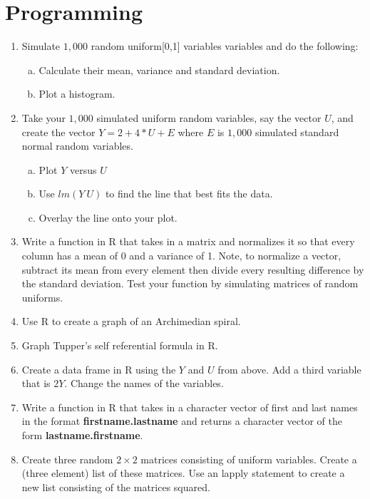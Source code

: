 \documentclass[12pt]{article}
\begin{document}
\section{Programming}
\begin{enumerate}[1.]
\item Simulate $1,000$ random uniform[0,1] variables
  variables and do the following:
  \begin{enumerate}[a.]
  \item Calculate their mean, variance and standard deviation.
  \item Plot a histogram.
  \end{enumerate}
\item Take your $1,000$ simulated uniform random variables, say the
  vector $U$, and create the vector $Y = 2 + 4 * U + E$ where $E$ is
  $1,000$ simulated standard normal random variables.
  \begin{enumerate}[a.]
  \item Plot $Y$ versus $U$
  \item Use $lm(Y ~ U)$ to find the line that best fits the data.
  \item Overlay the line onto your plot.
  \end{enumerate}
\item Write a function in R that takes in a matrix and normalizes it so that
  every column has a mean of 0 and a variance of 1. Note, to normalize
  a vector, subtract its mean from every element then divide every resulting difference
  by the standard deviation. Test your function by simulating matrices of random uniforms.
\item Use R to create a graph of an Archimedian spiral.
\item Graph Tupper's self referential formula in R.
\item Create a data frame in R using the $Y$ and $U$ from above. Add a third variable
  that is $2Y$. Change the names of the variables. 
\item Write a function in R that takes in a character vector of first and last names
  in the format {\bf firstname.lastname} and returns a character vector of the form
{\bf lastname.firstname}.
\item Create three random $2\times 2$ matrices consisting of uniform variables. 
  Create a (three element) list of these matrices. Use an lapply statement to create
  a new list consisting of the matrices squared.
\end{enumerate}
\end{document}
